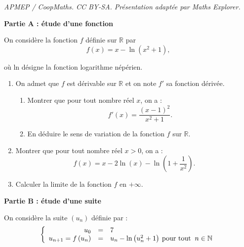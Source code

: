 \documentclass[10pt]{article}
\providecommand{\R}{\mathbb{R}}
\providecommand{\N}{\mathbb{N}}
\begin{document}
\noindent\textit{APMEP / CoopMaths. CC BY-SA. Présentation adaptée par Maths Explorer.}\par\medskip
\medskip

\begin{center}\textbf{Partie A : étude d'une fonction} \end{center}

On considère la fonction $f$ définie sur $\R$ par 
\[f(x) = x - \ln \left(x^2 + 1\right),\]

où ln désigne la fonction logarithme népérien.

\medskip

\begin{enumerate}
\item On admet que $f$ est dérivable sur $\R$ et on note $f'$ sa fonction dérivée.
	\begin{enumerate}
		\item Montrer que pour tout nombre réel $x$, on a :
\[f'(x) = \dfrac{(x - 1)^2}{ x^2 + 1}.\]

		\item En déduire le sens de variation de la fonction $f$ sur $\R$.
	\end{enumerate}
\item Montrer que pour tout nombre réel $x > 0$, on a :
\[f(x) = x - 2\ln (x) - \ln \left(1 + \dfrac{1}{x^2}\right).\]

\item Calculer la limite de la fonction $f$ en $+\infty$.
\end{enumerate}

\begin{center}\textbf{Partie B : étude d'une suite}
 \end{center}

On considère la suite $\left(u_n\right)$ définie par : 
\[\left\{\begin{array}{r c l}
u_0& =&7\\
u_{n+1} = f\left(u_n\right)& =&u_n - \ln\left(u_n^2 + 1\right)\:\text{pour tout }\:n \in \N
\end{array}\right.\]
\end{document}
